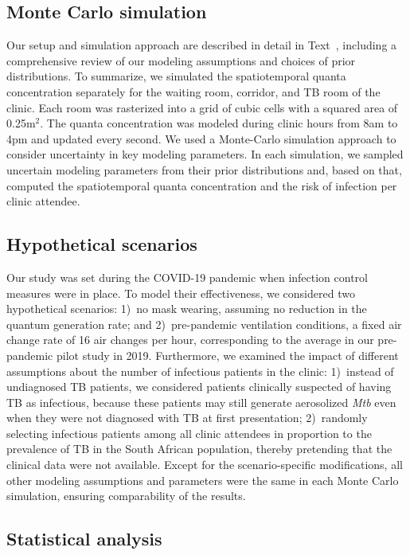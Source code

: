 \documentclass[fleqn,11pt]{wlscirep}
\begin{document}
\subsection{Monte Carlo simulation}

Our setup and simulation approach are described in detail in Text~, including a comprehensive review of our modeling assumptions and choices of prior distributions. To summarize, we simulated the spatiotemporal quanta concentration separately for the waiting room, corridor, and TB room of the clinic. Each room was rasterized into a grid of cubic cells with a squared area of 0.25m$^2$. The quanta concentration was modeled during clinic hours from 8am to 4pm and updated every second. We used a Monte-Carlo simulation approach to consider uncertainty in key modeling parameters. In each simulation, we sampled uncertain modeling parameters from their prior distributions and, based on that, computed the spatiotemporal quanta concentration and the risk of infection per clinic attendee. 

\subsection{Hypothetical scenarios}

Our study was set during the COVID-19 pandemic when infection control measures were in place. To model their effectiveness, we considered two hypothetical scenarios: 1)~no mask wearing, \ie assuming no reduction in the quantum generation rate; and 2)~pre-pandemic ventilation conditions, \ie a fixed air change rate of 16 air changes per hour, corresponding to the average in our pre-pandemic pilot study in 2019\cite{Zurcher2022JID}. Furthermore, we examined the impact of different assumptions about the number of infectious patients in the clinic: 1)~instead of undiagnosed TB patients, we considered patients clinically suspected of having TB as infectious, because these patients may still generate aerosolized \emph{Mtb} even when they were not diagnosed with TB at first presentation\cite{Patterson2024PNAS}; 2)~randomly selecting infectious patients among all clinic attendees in proportion to the prevalence of TB in the South African population\cite{Moyo2022LancetID}, thereby pretending that the clinical data were not available. Except for the scenario-specific modifications, all other modeling assumptions and parameters were the same in each Monte Carlo simulation, ensuring comparability of the results. 

\subsection{Statistical analysis}
\end{document}
